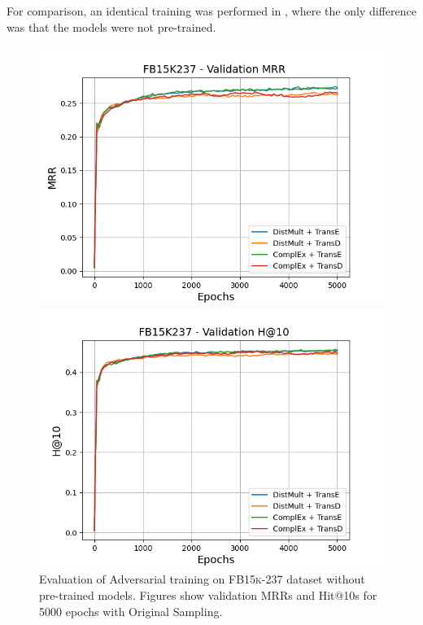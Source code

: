 For comparison, an identical training was performed in , where the only difference was that the models were not pre-trained.
\begin{figure}
    \centering
    \begin{minipage}{.5\textwidth}
      \centering
      \includegraphics[width=0.9\linewidth]{figures/results/gan_train/not_pretrained/random/fb15k237/epochs5000/random_fb15k237_mrrs.png}
    \end{minipage}%
    \begin{minipage}{.5\textwidth}
      \centering
      \includegraphics[width=0.9\linewidth]{figures/results/gan_train/not_pretrained/random/fb15k237/epochs5000/random_fb15k237_hit10.png}
    \end{minipage}
    \caption{Evaluation of Adversarial training on \textsc{FB15k-237} dataset without pre-trained models.
    Figures show validation MRRs and Hit@10s for 5000 epochs with Original Sampling.}
    \label{fig:original_not_pretrained_advtrain}
\end{figure}
